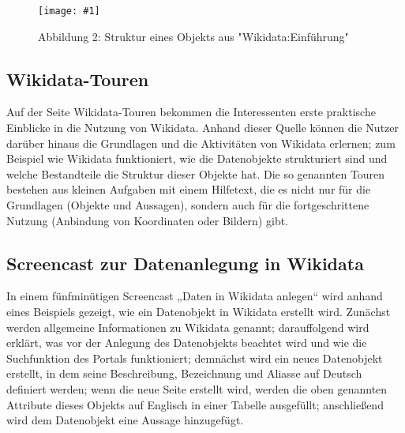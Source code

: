 \documentclass{article}
\newlength{\imgwidth}
\newcommand\scaledgraphics[2]{%
                
\settowidth{\imgwidth}{\texttt{[image: \#1]}}%
                
\setlength{\imgwidth}{\minof{\imgwidth}{#2\textwidth}}%
                
\texttt{[image: \#1]}%
                
}
\begin{document}
\begin{figure}
\scaledgraphics{2cea247d-8f76-4b1b-849c-7d7a9ad677ae.png}{1}
\caption*{Abbildung 2: Struktur eines Objekts aus "Wikidata:Einführung"}\label{F31998531}
\end{figure}





\subsection{Wikidata-Touren}\label{H784515}



Auf der Seite Wikidata-Touren \autocite{wikidata_wikidatatours_nodate} bekommen die Interessenten erste praktische Einblicke in die Nutzung von Wikidata. Anhand dieser Quelle können die Nutzer darüber hinaus die Grundlagen und die Aktivitäten von Wikidata erlernen; zum Beispiel wie Wikidata funktioniert, wie die Datenobjekte strukturiert sind und welche Bestandteile die Struktur dieser Objekte hat. Die so genannten Touren bestehen aus kleinen Aufgaben mit einem Hilfetext, die es nicht nur für die Grundlagen (Objekte und Aussagen), sondern auch für die fortgeschrittene Nutzung (Anbindung von Koordinaten oder Bildern) gibt.


\subsection{Screencast zur Datenanlegung in Wikidata}\label{H4699156}



In einem fünfminütigen Screencast „Daten in Wikidata anlegen“ \autocite{sidik_tool_2022} wird anhand eines Beispiels gezeigt, wie ein Datenobjekt in Wikidata erstellt wird. Zunächst werden allgemeine Informationen zu Wikidata genannt; darauffolgend wird erklärt, was vor der Anlegung des Datenobjekts beachtet wird und wie die Suchfunktion des Portals funktioniert; demnächst wird ein neues Datenobjekt erstellt, in dem seine Beschreibung, Bezeichnung und Aliasse auf Deutsch definiert werden; wenn die neue Seite erstellt wird, werden die oben genannten Attribute dieses Objekts auf Englisch in einer Tabelle ausgefüllt; anschließend wird dem Datenobjekt eine Aussage hinzugefügt.


\printbibliography[title={Literaturverzeichnis}]
\end{document}
